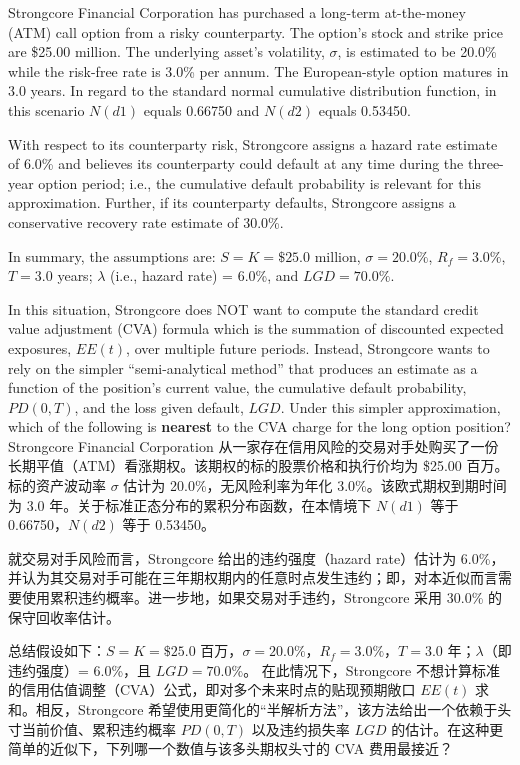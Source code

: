 \documentclass{article}
\newcounter{question} %
\begin{document}
  \begin{question}
      Strongcore Financial Corporation has purchased a long-term at-the-money (ATM) call option from a risky counterparty. The option’s stock and strike price are \$25.00 million. The underlying asset’s volatility, $\sigma$, is estimated to be 20.0\% while the risk-free rate is 3.0\% per annum. The European-style option matures in 3.0 years. In regard to the standard normal cumulative distribution function, in this scenario $N(d1)$ equals 0.66750 and $N(d2)$ equals 0.53450.
  
      With respect to its counterparty risk, Strongcore assigns a hazard rate estimate of 6.0\% and believes its counterparty could default at any time during the three-year option period; i.e., the cumulative default probability is relevant for this approximation. Further, if its counterparty defaults, Strongcore assigns a conservative recovery rate estimate of 30.0\%.
  
      In summary, the assumptions are: $S = K = \$25.0$ million, $\sigma = 20.0\%$, $R_f = 3.0\%$, $T = 3.0$ years; $\lambda$ (i.e., hazard rate) = 6.0\%, and $LGD = 70.0\%$.
  
      In this situation, Strongcore does NOT want to compute the standard credit value adjustment (CVA) formula which is the summation of discounted expected exposures, $EE(t)$, over multiple future periods. Instead, Strongcore wants to rely on the simpler ``semi-analytical method'' that produces an estimate as a function of the position’s current value, the cumulative default probability, $PD(0,T)$, and the loss given default, $LGD$. Under this simpler approximation, which of the following is \textbf{nearest} to the CVA charge for the long option position?\\
      Strongcore Financial Corporation 从一家存在信用风险的交易对手处购买了一份长期平值（ATM）看涨期权。该期权的标的股票价格和执行价均为 \$25.00 百万。标的资产波动率 $\sigma$ 估计为 20.0\%，无风险利率为年化 3.0\%。该欧式期权到期时间为 3.0 年。关于标准正态分布的累积分布函数，在本情境下 $N(d1)$ 等于 0.66750，$N(d2)$ 等于 0.53450。

      就交易对手风险而言，Strongcore 给出的违约强度（hazard rate）估计为 6.0\%，并认为其交易对手可能在三年期权期内的任意时点发生违约；即，对本近似而言需要使用累积违约概率。进一步地，如果交易对手违约，Strongcore 采用 30.0\% 的保守回收率估计。

      总结假设如下：$S = K = \$25.0$ 百万，$\sigma = 20.0\%$，$R_f = 3.0\%$，$T = 3.0$ 年；$\lambda$（即违约强度）= 6.0\%，且 $LGD = 70.0\%$。
      在此情况下，Strongcore 不想计算标准的信用估值调整（CVA）公式，即对多个未来时点的贴现预期敞口 $EE(t)$ 求和。相反，Strongcore 希望使用更简化的“半解析方法”，该方法给出一个依赖于头寸当前价值、累积违约概率 $PD(0,T)$ 以及违约损失率 $LGD$ 的估计。在这种更简单的近似下，下列哪一个数值与该多头期权头寸的 CVA 费用最接近？
  \end{question}
  
\end{document}
